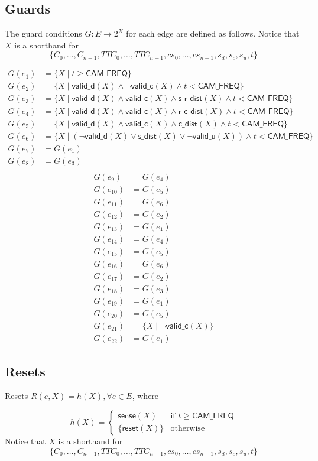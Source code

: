 \documentclass[12pt]{article}
\theoremstyle{definition}
\begin{document}
\subsection{Guards}

The guard conditions $G: E \to 2^{X}$ for each edge are defined as follows. Notice that $X$ is a shorthand for 
\[\{C_0, \ldots, C_{n-1}, TTC_0, \ldots, TTC_{n-1}, cs_0, \ldots, cs_{n-1}, s_d, s_c, s_u, t\}\]

\[
\begin{aligned}
G(e_1)  &= \{X \mid t \ge \mathsf{CAM\_FREQ}\} \\
G(e_2)  &= \{X \mid \mathsf{valid\_d}(X) \land \neg \mathsf{valid\_c}(X) \land  t < \mathsf{CAM\_FREQ} \} \\
G(e_3)  &= \{X \mid \mathsf{valid\_d}(X) \land \mathsf{valid\_c}(X) \land \mathsf{s\_r\_dist}(X) \land t < \mathsf{CAM\_FREQ} \} \\
G(e_4)  &= \{X \mid \mathsf{valid\_d}(X) \land \mathsf{valid\_c}(X) \land \mathsf{r\_c\_dist}(X) \land t < \mathsf{CAM\_FREQ}\} \\
G(e_5)  &= \{X \mid \mathsf{valid\_d}(X) \land \mathsf{valid\_c}(X) \land \mathsf{c\_dist}(X) \land t < \mathsf{CAM\_FREQ}\} \\
G(e_6)  &= \{X \mid (\neg \mathsf{valid\_d}(X) \lor \mathsf{s\_dist}(X) \lor \neg \mathsf{valid\_u}(X)) \land  t < \mathsf{CAM\_FREQ} \} \\
G(e_7)  &= G(e_1) \\
G(e_8) &= G(e_3) \\ 
\end{aligned}
\]
\[
\begin{aligned}
G(e_9) &= G(e_4) \\
G(e_{10}) &= G(e_5) \\ 
G(e_{11}) &= G(e_6) \\
G(e_{12}) &= G(e_2) \\ 
G(e_{13}) &= G(e_1) \\
G(e_{14}) &= G(e_4) \\
G(e_{15}) &= G(e_5) \\
G(e_{16}) &= G(e_6) \\
G(e_{17}) &= G(e_2) \\
G(e_{18}) &= G(e_3) \\
G(e_{19}) &= G(e_1) \\
G(e_{20}) &= G(e_5)\\
G(e_{21}) &= \{ X \mid \neg \mathsf{valid\_c}(X)\} \\
G(e_{22}) &= G(e_1) 
\end{aligned}
\]

\subsection{Resets}

Resets $ R(e,X) = h(X), \forall e \in E$, where 

\[
    h(X) = 
    \begin{cases}
        \mathsf{sense}(X) & \text{if } t \ge \mathsf{CAM\_FREQ} \\
        \{\mathsf{reset}(X)\} & \text{otherwise}
    \end{cases}
\]
Notice that $X$ is a shorthand for 
\[\{C_0, \ldots, C_{n-1}, TTC_0, \ldots, TTC_{n-1}, cs_0, \ldots, cs_{n-1}, s_d, s_c, s_u, t\}\]
\end{document}
